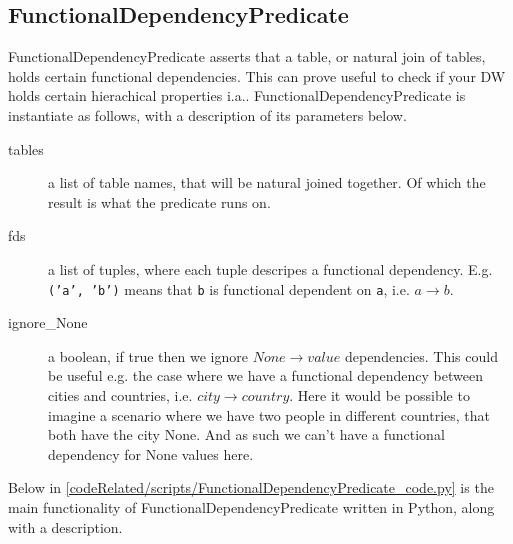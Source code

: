 \subsection{FunctionalDependencyPredicate}
FunctionalDependencyPredicate asserts that a table, or natural join of tables, holds certain functional dependencies. This can prove useful to check if your DW holds certain hierachical properties i.a.. FunctionalDependencyPredicate is instantiate as follows, with a description of its parameters below.


\begin{description}
\item [tables] a list of table names, that will be natural joined together. Of which the result is what the predicate runs on. 
\item [fds] a list of tuples, where each tuple descripes a functional dependency. E.g. \texttt{('a', 'b')} means that \texttt{b} is functional dependent on \texttt{a}, i.e. $a \rightarrow b$.
\item [ignore\_None] a boolean, if true then we ignore $None \rightarrow value$ dependencies. This could be useful e.g. the case where we have a functional dependency between cities and countries, i.e. $city \rightarrow country$. Here it would be possible to imagine a scenario where we have two people in different countries, that both have the city None. And as such we can't have a functional dependency for None values here.
  
\end{description}

Below in \cref{codeRelated/scripts/FunctionalDependencyPredicate_code.py} is the main functionality of FunctionalDependencyPredicate written in Python, along with a description. 


